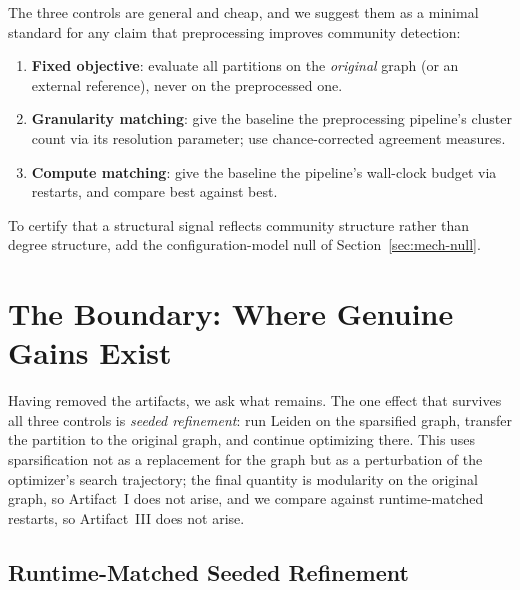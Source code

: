 \documentclass[10pt,journal,compsoc]{IEEEtran}
\begin{document}
The three controls are general and cheap, and we suggest them as a minimal standard for any claim that preprocessing improves community detection:
\begin{enumerate}
    \item \textbf{Fixed objective}: evaluate all partitions on the \emph{original} graph (or an external reference), never on the preprocessed one.
    \item \textbf{Granularity matching}: give the baseline the preprocessing pipeline's cluster count via its resolution parameter; use chance-corrected agreement measures.
    \item \textbf{Compute matching}: give the baseline the pipeline's wall-clock budget via restarts, and compare best against best.
\end{enumerate}
To certify that a structural signal reflects community structure rather than degree structure, add the configuration-model null of Section~\ref{sec:mech-null}.


\section{The Boundary: Where Genuine Gains Exist}
\label{sec:boundary}

Having removed the artifacts, we ask what remains.
The one effect that survives all three controls is \emph{seeded refinement}: run Leiden on the sparsified graph, transfer the partition to the original graph, and continue optimizing there.
This uses sparsification not as a replacement for the graph but as a perturbation of the optimizer's search trajectory; the final quantity is modularity on the original graph, so Artifact~I does not arise, and we compare against runtime-matched restarts, so Artifact~III does not arise.

\subsection{Runtime-Matched Seeded Refinement}
\label{sec:boundary-seeded}


\end{document}
